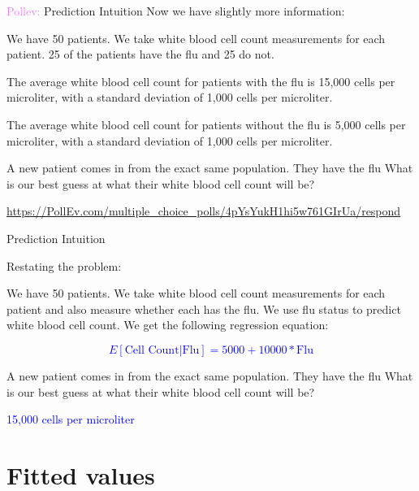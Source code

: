 \documentclass[10pt,t]{beamer}
\begin{document}
\begin{frame}{\textcolor{violet}{Pollev:} Prediction Intuition}
	\vspace{-5 mm}
	Now we have slightly more information:
	
	\medskip
	
	We have 50 patients. We take white blood cell count measurements for each patient. 25 of the patients have the flu and 25 do not. 
	
	\medskip
	
	The average white blood cell count for patients with the flu is 15,000 cells per microliter, with a standard deviation of 1,000 cells per microliter.
	\medskip
	
	The average white blood cell count for patients without the flu is 5,000 cells per microliter, with a standard deviation of 1,000 cells per microliter.
	\medskip
	
	A new patient comes in from the exact same population. They have the flu What is our best guess at what their white blood cell count will be?
	
		\smallskip
	
	\url{https://PollEv.com/multiple_choice_polls/4pYsYukH1hi5w761GIrUa/respond}
	
	
\end{frame}

\begin{frame}{Prediction Intuition}
	
	Restating the problem:
	
	\medskip
	
	We have 50 patients. We take white blood cell count measurements for each patient and also measure whether each has the flu. We use flu status to predict white blood cell count. We get the following regression equation:
	
	\medskip
	
\textcolor{blue}{	\[E[\text{Cell Count}|\text{Flu}]=5000+10000*\text{Flu}\]}
	\medskip
	
	A new patient comes in from the exact same population. They have the flu What is our best guess at what their white blood cell count will be?
	
	\bigskip
	
	\textcolor{blue}{15,000 cells per microliter}
	
	
\end{frame}

\section{Fitted values}
\end{document}
